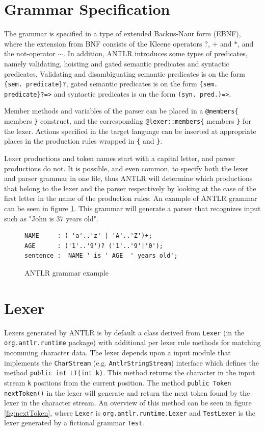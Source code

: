 \section{Grammar Specification}
\label{sect:antlr:grammarSpec}
The grammar is specified in a type of extended Backus-Naur form (EBNF), where the extension from BNF consists of the Kleene operators $?$, $ +$ and $\ast$, and the not-operator $\sim$.  In addition, ANTLR introduces some types of predicates, namely validating, hoisting and gated semantic predicates and syntactic predicates. Validating and disambiguating semantic predicates is on the form \verb!{sem. predicate}?!, gated semantic predicates is on the form \verb!{sem. predicate}?=>! and syntactic predicates is on the form \verb!(syn. pred.)=>!.

Member methods and variables of the parser can be placed in a \verb!@members{! members \verb!}! construct, and the corresponding \verb!@lexer::members{! members \verb!}! for the lexer. Actions specified in the target language can be inserted at appropriate places in the production rules wrapped in \verb!{! and \verb!}!. 

Lexer productions and token names start with a capital letter, and parser productions do not. It is possible, and even common, to specify both the lexer and parser grammar in one file, thus ANTLR will determine which productions that belong to the lexer and the parser respectively by looking at the case of the first letter in the name of the production rules. An example of ANTLR grammar can be seen in figure \ref{code:simpleGrammar}. This grammar will generate a parser that recognizes input such as "John is 37 years old".
\begin{figure}[h!]
\begin{verbatim}
NAME     : ( 'a'..'z' | 'A'..'Z')+;  
AGE      : ('1'..'9')? ('1'..'9'|'0');
sentence :  NAME ' is ' AGE  ' years old';
\end{verbatim}
\caption{ANTLR grammar example}
\label{code:simpleGrammar}
\end{figure}

\section{Lexer}
\label{sect:antlr:lexer}
Lexers generated by ANTLR is by default a class derived from \verb!Lexer! (in the \verb!org.antlr.runtime! package) with additional per lexer rule methods for matching incomming character data. The lexer depends upon a input module that implements the \verb!CharStream! (e.g. \verb!AntlrStringStream!) interface which defines the method \verb!public int LT(int k)!. This method returns the character in the input stream \verb!k! positions from the current position. The method \verb!public Token nextToken()! in the lexer will generate and return the next token found by the lexer in the character stream. An overview of this method can be seen in figure \ref{fig:nextToken}, where \verb!Lexer! is \verb!org.antlr.runtime.Lexer! and \verb!TestLexer! is the lexer generated by a fictional grammar \verb!Test!.

